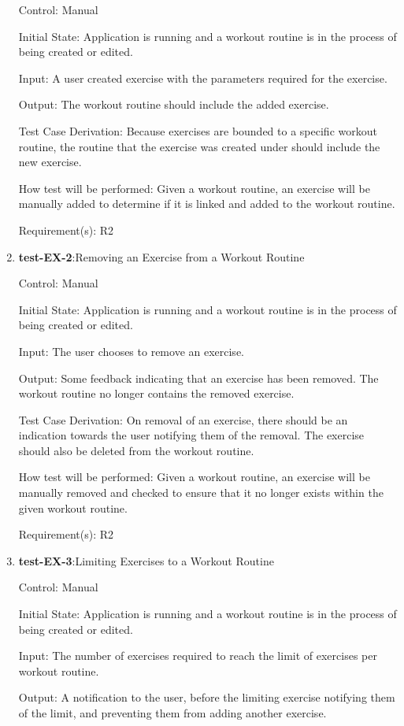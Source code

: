 \documentclass[12pt, titlepage]{article}
\begin{document}
\begin{enumerate}
		Control: Manual
		
		Initial State: Application is running and a workout routine is in the process of being created or edited.
		
		Input: A user created exercise with the parameters required for the exercise.
		
		Output: The workout routine should include the added exercise.
		
		Test Case Derivation: Because exercises are bounded to a specific workout routine, the routine that the exercise was created under should include the new exercise.
		
		How test will be performed: Given a workout routine, an exercise will be manually added to determine if it is linked and added to the workout routine.
		
		Requirement(s): R2
		
		
		\item{\textbf{test-EX-2}}:Removing an Exercise from a Workout Routine
		
		Control: Manual
		
		Initial State: Application is running and a workout routine is in the process of being created or edited.
		
		Input: The user chooses to remove an exercise.
		
		Output: Some feedback indicating that an exercise has been removed. The workout routine no longer contains the removed exercise.
		
		Test Case Derivation: On removal of an exercise, there should be an indication towards the user notifying them of the removal. The exercise should also be deleted from the workout routine.
		
		How test will be performed: Given a workout routine, an exercise will be manually removed and checked to ensure that it no longer exists within the given workout routine.
		
		Requirement(s): R2
		
		
		\item{\textbf{test-EX-3}}:Limiting Exercises to a Workout Routine
		
		Control: Manual
		
		Initial State: Application is running and a workout routine is in the process of being created or edited.
		
		Input: The number of exercises required to reach the limit of exercises per workout routine. 
		
		Output: A notification to the user, before the limiting exercise notifying them of the limit, and preventing them from adding another exercise.
		

\end{enumerate}
\end{document}
